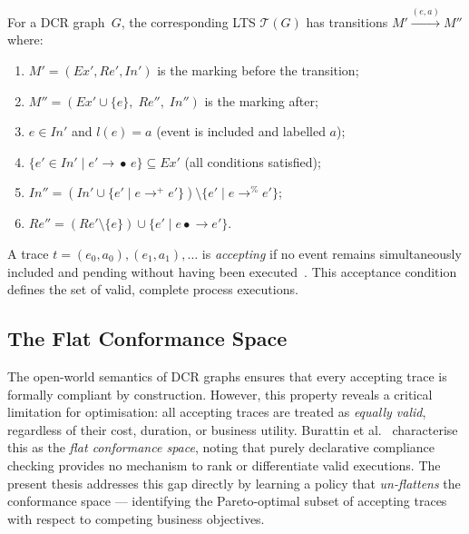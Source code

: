 \begin{definition}
\label{def:dcr_transitions}
For a DCR graph~$G$, the corresponding \ac{LTS} $\mathcal{T}(G)$ has transitions
$M' \xrightarrow{(e,a)} M''$ where:
\begin{enumerate}
  \item $M' = (\mathit{Ex}', \mathit{Re}', \mathit{In}')$ is the marking
    before the transition;
  \item $M'' = (\mathit{Ex}' \cup \{e\},\; \mathit{Re}'',\; \mathit{In}'')$
    is the marking after;
  \item $e \in \mathit{In}'$ and $l(e) = a$ (event is included and labelled
    $a$);
  \item $\{e' \in \mathit{In}' \mid e' \rightarrow\!\bullet\, e\} \subseteq
    \mathit{Ex}'$ (all conditions satisfied);
  \item $\mathit{In}'' = (\mathit{In}' \cup \{e' \mid e
    \rightarrow^+ e'\}) \setminus \{e' \mid e \rightarrow^\% e'\}$;
  \item $\mathit{Re}'' = (\mathit{Re}' \setminus \{e\}) \cup \{e' \mid e
    \bullet\!\rightarrow e'\}$.
\end{enumerate}
\end{definition}

A trace $t = (e_0,a_0),(e_1,a_1),\ldots$ is \emph{accepting} if no event
remains simultaneously included and pending without having been
executed~\cite{Diaz2024Pareto-OptimalModels}.  This acceptance condition
defines the set of valid, complete process executions.

\subsection{The Flat Conformance Space}
\label{sec:flat_conformance}

The open-world semantics of DCR graphs ensures that every accepting trace is
formally compliant by construction.  However, this property reveals a critical
limitation for optimisation: all accepting traces are treated as \emph{equally
valid}, regardless of their cost, duration, or business utility.  Burattin
et al.~\cite{Burattin2021ExploringSpace} characterise this
as the \emph{flat conformance space}, noting that purely declarative compliance
checking provides no mechanism to rank or differentiate valid executions.  The
present thesis addresses this gap directly by learning a policy that
\emph{un-flattens} the conformance space --- identifying the Pareto-optimal
subset of accepting traces with respect to competing business objectives.

